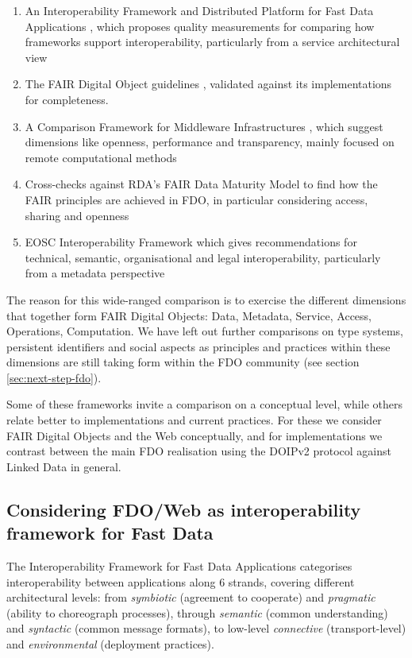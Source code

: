 \documentclass[fleqn,10pt,lineno]{wlpeerjlua}
\providecommand{\tightlist}{%
  \setlength{\itemsep}{0pt}\setlength{\parskip}{0pt}}
\begin{document}
\begin{enumerate}
\def\labelenumi{\arabic{enumi}.}
\tightlist
\item
  An Interoperability Framework and Distributed Platform for Fast Data Applications \cite{KlCFFFyL}, which proposes quality measurements for comparing how frameworks support interoperability, particularly from a service architectural view
\item
  The FAIR Digital Object guidelines \cite{RwvirqWg}, validated against its implementations for completeness.
\item
  A Comparison Framework for Middleware Infrastructures \cite{hRzcHhPD}, which suggest dimensions like openness, performance and transparency, mainly focused on remote computational methods
\item
  Cross-checks against RDA's FAIR Data Maturity Model \cite{UzQhqk0M} to find how the FAIR principles are achieved in FDO, in particular considering access, sharing and openness
\item
  EOSC Interoperability Framework \cite{aCye3KpE} which gives recommendations for technical, semantic, organisational and legal interoperability, particularly from a metadata perspective
\end{enumerate}

The reason for this wide-ranged comparison is to exercise the different dimensions that together form FAIR Digital Objects: Data, Metadata, Service, Access, Operations, Computation.
We have left out further comparisons on type systems, persistent identifiers and social aspects as principles and practices within these dimensions are still taking form within the FDO community (see section \ref{sec:next-step-fdo}).

Some of these frameworks invite a comparison on a conceptual level, while others relate better to implementations and current practices. For these we consider FAIR Digital Objects and the Web conceptually, and for implementations we contrast between the main FDO realisation using the DOIPv2 protocol \cite{13TcbsZF6} against Linked Data in general.

\hypertarget{sec:interoperability-compare}{%
\subsection*{Considering FDO/Web as interoperability framework for Fast Data}\label{sec:interoperability-compare}}

The Interoperability Framework for Fast Data Applications \cite{KlCFFFyL} categorises interoperability between applications along 6 strands, covering different architectural levels: from \emph{symbiotic} (agreement to cooperate) and \emph{pragmatic} (ability to choreograph processes), through \emph{semantic} (common understanding) and \emph{syntactic} (common message formats), to low-level \emph{connective} (transport-level) and \emph{environmental} (deployment practices).
\end{document}
